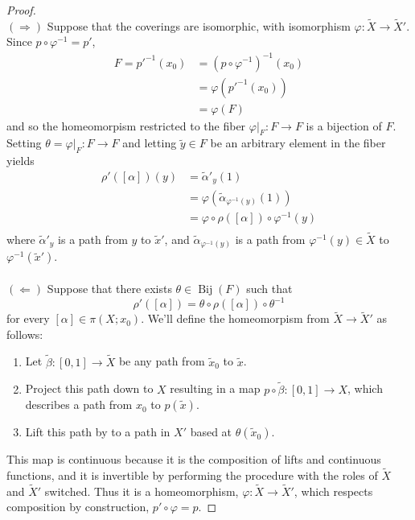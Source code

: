 \documentclass{article}
\newcommand{\fn}[3]{#1 \colon #2 \rightarrow #3}
\newcommand{\inv}[1]{#1^{-1}}
\begin{document}
\begin{proof} \text{} \\
  $(\Longrightarrow)$ Suppose that the coverings are isomorphic, with
  isomorphism $\fn{\varphi}{\widetilde X}{\widetilde X'}$.\\
  Since $p \circ \inv\varphi = p'$, \begin{align*}
    F = \inv{p'}(x_0) &= \inv{(p \circ \inv\varphi)}(x_0) \\
    &= \varphi(\inv{p'}(x_0)) \\
    &= \varphi(F)
  \end{align*} and so the homeomorpism restricted to the fiber
  $\varphi|_F\colon F \rightarrow F$ is a bijection of $F$.
  \\
  Setting $\theta = \varphi|_F\colon F \rightarrow F$ and letting
  $\widetilde y \in F$ be an arbitrary element in the fiber yields \begin{align*}
    \rho'([\alpha])(y) &= \widetilde\alpha'_{y}(1) \\
    &= \varphi(\widetilde\alpha_{\inv\varphi(y)}(1)) \\
    &= \varphi \circ \rho([\alpha]) \circ \inv\varphi(y) \\
  \end{align*} where $\widetilde\alpha'_y$ is a path from $y$ to $\widetilde x'$,
  and $\widetilde\alpha_{\inv\varphi(y)}$ is a path from
  $\inv\varphi(y) \in \widetilde X$ to $\inv\varphi(\widetilde x')$.
  \\~\\
  $(\Longleftarrow)$ Suppose that there exists
  $\theta \in \operatorname{Bij}(F)$ such that \[
    \rho'([\alpha]) = \theta \circ \rho([\alpha]) \circ \inv\theta
  \] for every $[\alpha] \in \pi(X; x_0)$.
  We'll define the homeomorpism from $\widetilde X \rightarrow \widetilde X'$
  as follows:
  \begin{enumerate}
    \item Let $\fn{\widetilde\beta}{[0,1]}{\widetilde X}$ be any path from
    $\widetilde x_0$ to $\widetilde x$.
    \item Project this path down to $X$ resulting in a map
    $\fn{p \circ \widetilde \beta}{[0, 1]}{X}$, which describes a path from
    $x_0$ to $p(\widetilde x)$.
    \item Lift this path by to a path in $X'$ based at $\theta(\widetilde x_0)$.
  \end{enumerate}
  This map is continuous because it is the composition of lifts and continuous
  functions, and it is invertible by performing the procedure with the roles of
  $\widetilde X$ and $\widetilde X'$ switched. Thus it is a homeomorphism,
  $\fn{\varphi}{\widetilde X}{\widetilde X'}$, which respects composition by
  construction, $p' \circ \varphi = p$.
\end{proof}
\end{document}
